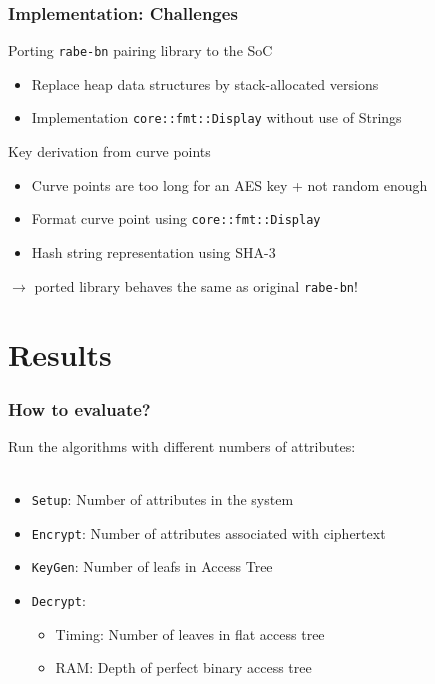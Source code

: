 \begin{frame}[c, fragile]
    \frametitle{Implementation: Challenges}
    \begin{block}{Porting \texttt{rabe-bn} pairing library to the SoC}
        \begin{itemize}
            \item Replace heap data structures by stack-allocated versions
            \item Implementation \verb+core::fmt::Display+ without use of Strings
        \end{itemize}
    \end{block}
    \begin{block}{Key derivation from curve points}
        \begin{itemize}
            \item Curve points are too long for an AES key + not random enough
            \item Format curve point using \verb+core::fmt::Display+
            \item Hash string representation using SHA-3
        \end{itemize}
    \end{block}
    \begin{center}
        \alert{\large $\rightarrow$ ported library behaves the same as original \texttt{rabe-bn}!}
    \end{center}
\end{frame}

\section{Results}

\begin{frame}[c]
    \frametitle{How to evaluate?}
    \begin{minipage}{.59\textwidth}
        Run the algorithms with different numbers of attributes:\\
        ~
        \begin{itemize} 
            \setlength\itemsep{.75em}
            \item \texttt{Setup}: Number of attributes in the system
            \item \texttt{Encrypt}: Number of attributes associated with ciphertext
            \item \texttt{KeyGen}: Number of leafs in Access Tree
            \item \texttt{Decrypt}: \begin{itemize}
                \item Timing: Number of leaves in flat access tree
                \item RAM: Depth of perfect binary access tree
            \end{itemize}
        \end{itemize}
    \end{minipage}
    \begin{minipage}{.4\textwidth}
        
    \end{minipage}
\end{frame}

